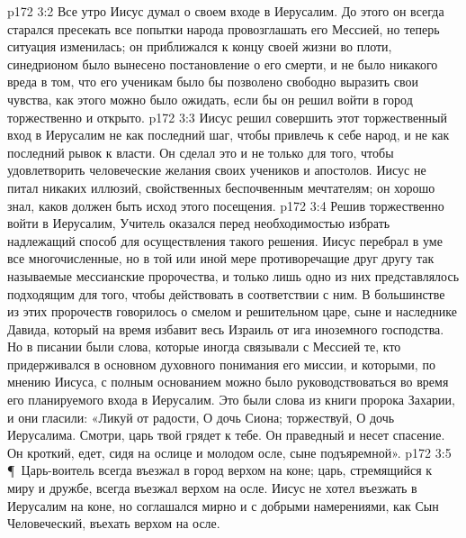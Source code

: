 \vs p172 3:2 Все утро Иисус думал о своем входе в Иерусалим. До этого он всегда старался пресекать все попытки народа провозглашать его Мессией, но теперь ситуация изменилась; он приближался к концу своей жизни во плоти, синедрионом было вынесено постановление о его смерти, и не было никакого вреда в том, что его ученикам было бы позволено свободно выразить свои чувства, как этого можно было ожидать, если бы он решил войти в город торжественно и открыто.
\vs p172 3:3 Иисус решил совершить этот торжественный вход в Иерусалим не как последний шаг, чтобы привлечь к себе народ, и не как последний рывок к власти. Он сделал это и не только для того, чтобы удовлетворить человеческие желания своих учеников и апостолов. Иисус не питал никаких иллюзий, свойственных беспочвенным мечтателям; он хорошо знал, каков должен быть исход этого посещения.
\vs p172 3:4 Решив торжественно войти в Иерусалим, Учитель оказался перед необходимостью избрать надлежащий способ для осуществления такого решения. Иисус перебрал в уме все многочисленные, но в той или иной мере противоречащие друг другу так называемые мессианские пророчества, и только лишь одно из них представлялось подходящим для того, чтобы действовать в соответствии с ним. В большинстве из этих пророчеств говорилось о смелом и решительном царе, сыне и наследнике Давида, который на время избавит весь Израиль от ига иноземного господства. Но в писании были слова, которые иногда связывали с Мессией те, кто придерживался в основном духовного понимания его миссии, и которыми, по мнению Иисуса, с полным основанием можно было руководствоваться во время его планируемого входа в Иерусалим. Это были слова из книги пророка Захарии, и они гласили: «Ликуй от радости, О дочь Сиона; торжествуй, О дочь Иерусалима. Смотри, царь твой грядет к тебе. Он праведный и несет спасение. Он кроткий, едет, сидя на ослице и молодом осле, сыне подъяремной».
\vs p172 3:5 \P\ Царь\hyp{}воитель всегда въезжал в город верхом на коне; царь, стремящийся к миру и дружбе, всегда въезжал верхом на осле. Иисус не хотел въезжать в Иерусалим на коне, но соглашался мирно и с добрыми намерениями, как Сын Человеческий, въехать верхом на осле.
